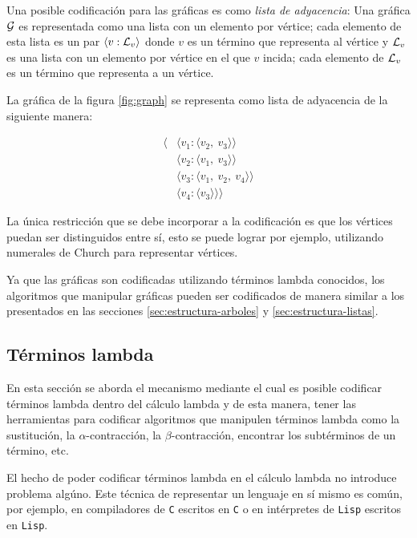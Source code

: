 Una posible codificación para las gráficas es como \emph{lista de adyacencia}: Una gráfica \( \mathcal{G} \) es representada como una lista con un elemento por vértice; cada elemento de esta lista es un par \( \langle v : \mathcal{L}_{v} \rangle \) donde \( v \) es un término que representa al vértice y \( \mathcal{L}_{v} \) es una lista con un elemento por vértice en el que \( v \) incida; cada elemento de \( \mathcal{L}_{v} \) es un término que representa a un vértice.

La gráfica de la figura \ref{fig:graph} se representa como lista de adyacencia de la siguiente manera:

\begin{align*}
  \langle &\langle v_{1} : \langle v_{2},\ v_{3} \rangle \rangle\\
          &\langle v_{2} : \langle v_{1},\ v_{3} \rangle \rangle\\
          &\langle v_{3} : \langle v_{1},\ v_{2},\ v_{4} \rangle \rangle\\
          &\langle v_{4} : \langle v_{3} \rangle \rangle \rangle
\end{align*}

La única restricción que se debe incorporar a la codificación es que los vértices puedan ser distinguidos entre sí, esto se puede lograr por ejemplo, utilizando numerales de Church para representar vértices.

Ya que las gráficas son codificadas utilizando términos lambda conocidos, los algoritmos que manipular gráficas pueden ser codificados de manera similar a los presentados en las secciones \ref{sec:estructura-arboles} y  \ref{sec:estructura-listas}.

\subsection{Términos lambda}
\label{sec:estructura-lambda}

En esta sección se aborda el mecanismo mediante el cual es posible codificar términos lambda dentro del cálculo lambda y de esta manera, tener las herramientas para codificar algoritmos que manipulen términos lambda como la sustitución, la \( α \)-contracción, la \( β \)-contracción, encontrar los subtérminos de un término, etc.

El hecho de poder codificar términos lambda en el cálculo lambda no introduce problema algúno. Este técnica de representar un lenguaje en sí mismo es común, por ejemplo, en compiladores de \texttt{C} escritos en \texttt{C} o en intérpretes de \texttt{Lisp} escritos en \texttt{Lisp}.

